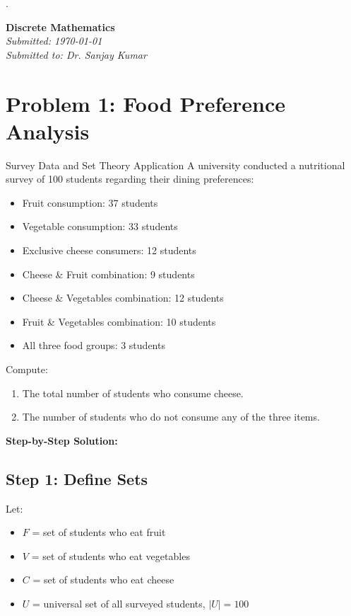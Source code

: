 \documentclass[14pt,a4paper]{article}
\begin{document}
.
\begin{center}
    {\Huge \textbf{Discrete Mathematics }}\\[1em]
    \textit{Submitted: \today}\\
    \textit{Submitted to: Dr. Sanjay Kumar}
\end{center}


\section*{Problem 1: Food Preference Analysis}

\begin{myproblem}{Survey Data and Set Theory Application}
A university conducted a nutritional survey of 100 students regarding their dining preferences:
\begin{itemize}
    \item Fruit consumption: 37 students
    \item Vegetable consumption: 33 students
    \item Exclusive cheese consumers: 12 students
    \item Cheese \& Fruit combination: 9 students
    \item Cheese \& Vegetables combination: 12 students
    \item Fruit \& Vegetables combination: 10 students
    \item All three food groups: 3 students
\end{itemize}
Compute:
\begin{enumerate}[label=(\alph*)]
    \item The total number of students who consume cheese.
    \item The number of students who do not consume any of the three items.
\end{enumerate}
\end{myproblem}

\textbf{Step-by-Step Solution:}

\subsection*{Step 1: Define Sets}
Let:
\begin{itemize}
    \item $F$ = set of students who eat fruit
    \item $V$ = set of students who eat vegetables
    \item $C$ = set of students who eat cheese
    \item $U$ = universal set of all surveyed students, $|U| = 100$
\end{itemize}
\end{document}
